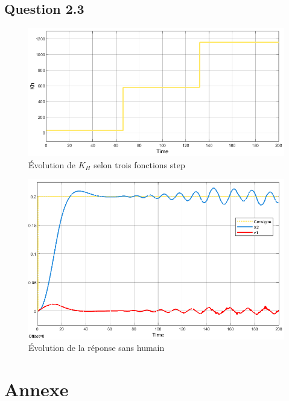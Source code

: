 \documentclass[a4paper,12pt]{article}
\begin{document}
    \subsection{Question 2.3}
    \begin{figure}[H]
        \centering
        \includegraphics[width=15cm]{./img/Kh_Evolution_Steps.png}
        \caption{Évolution de $K_H$ selon trois fonctions step\label{fig:KhSteps}}
    \end{figure}
    \begin{figure}[H]
        \centering
        \includegraphics[width=16cm]{./img/response_KhSteps.png}
        \caption{Évolution de la réponse sans humain\label{fig:RespKhSteps}}
    \end{figure}
    
    
    
    \newpage
    \section{Annexe}
\end{document}
